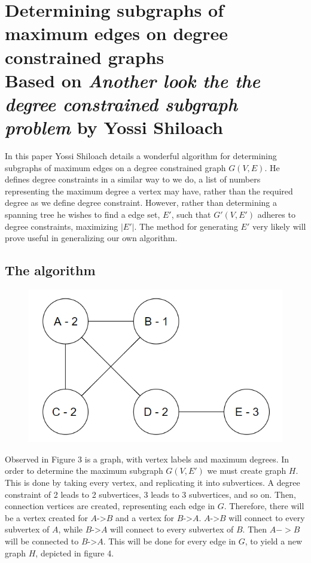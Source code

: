 \documentclass{article}
\begin{document}
	\section{Determining subgraphs of maximum edges on degree constrained graphs \\ {\large Based on \textit{Another look the the degree constrained subgraph problem} by Yossi Shiloach}}
	In this paper Yossi Shiloach details a wonderful algorithm for determining subgraphs of maximum edges on a degree constrained graph $G(V,E)$. He defines
	degree constraints in a similar way to we do, a list of numbers representing the maximum degree a vertex may have, rather than the required degree as we define degree constraint. However, rather than determining a spanning tree he wishes to find a edge set, $E'$, such that $G'(V,E')$ adheres to degree constraints, maximizing $|E'|$. The method for generating $E'$ very likely will prove useful in generalizing our own algorithm.
	\subsection{The algorithm}
	
		\begin{figure}[H]
			\caption{}
			\includegraphics{Figure3}
		\end{figure}
	
	Observed in Figure 3 is a graph, with vertex labels and maximum degrees. In order to determine the maximum subgraph $G(V,E')$ we must create graph $H$. This is done by taking every vertex, and replicating it into subvertices. A degree constraint of 2 leads to 2 subvertices, 3 leads to 3 subvertices, and so on. Then, connection vertices are created, representing each edge in $G$. Therefore, there will be a vertex created for $A$->$B$ and a vertex for $B$->$A$. $A$->$B$ will connect to every subvertex of $A$, while  $B$->$A$ will connect to every subvertex of $B$. Then $A->B$ will be connected to  $B$->$A$. This will be done for every edge in $G$, to yield a new graph $H$, depicted in figure 4.
	
\end{document}
